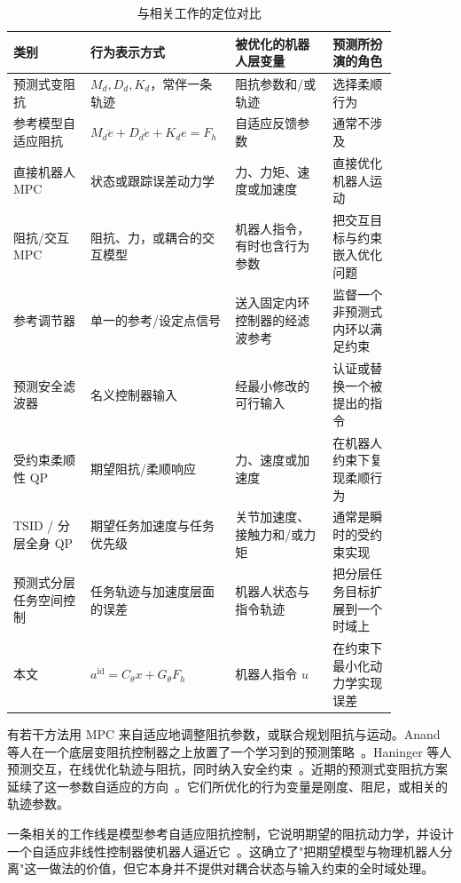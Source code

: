 \documentclass[journal]{IEEEtran}
\begin{document}
\begin{table}[t]
\centering
\caption{与相关工作的定位对比}
\label{tab:related}
\small
\begin{tabular}{@{}>{\raggedright\arraybackslash}p{0.19\linewidth}
>{\raggedright\arraybackslash}p{0.27\linewidth}
>{\raggedright\arraybackslash}p{0.24\linewidth}
>{\raggedright\arraybackslash}p{0.16\linewidth}@{}}
\toprule
类别 & 行为表示方式 & 被优化的机器人层变量 & 预测所扮演的角色 \\
\midrule
预测式变阻抗 & $M_d,D_d,K_d$，常伴一条轨迹 & 阻抗参数和/或轨迹 & 选择柔顺行为 \\
参考模型自适应阻抗 & $M_d\ddot e+D_d\dot e+K_de=F_h$ & 自适应反馈参数 & 通常不涉及 \\
直接机器人 MPC & 状态或跟踪误差动力学 & 力、力矩、速度或加速度 & 直接优化机器人运动 \\
阻抗/交互 MPC & 阻抗、力，或耦合的交互模型 & 机器人指令，有时也含行为参数 & 把交互目标与约束嵌入优化问题 \\
参考调节器 & 单一的参考/设定点信号 & 送入固定内环控制器的经滤波参考 & 监督一个非预测式内环以满足约束 \\
预测安全滤波器 & 名义控制器输入 & 经最小修改的可行输入 & 认证或替换一个被提出的指令 \\
受约束柔顺性 QP & 期望阻抗/柔顺响应 & 力、速度或加速度 & 在机器人约束下复现柔顺行为 \\
TSID / 分层全身 QP & 期望任务加速度与任务优先级 & 关节加速度、接触力和/或力矩 & 通常是瞬时的受约束实现 \\
预测式分层任务空间控制 & 任务轨迹与加速度层面的误差 & 机器人状态与指令轨迹 & 把分层任务目标扩展到一个时域上 \\
本文 & $a^{\mathrm{id}}=C_\theta x+G_\theta F_h$ & 机器人指令 $u$ & 在约束下最小化动力学实现误差 \\
\bottomrule
\end{tabular}
\end{table}

有若干方法用 MPC 来自适应地调整阻抗参数，或联合规划阻抗与运动。Anand 等人在一个底层变阻抗控制器之上放置了一个学习到的预测策略~\cite{ref1}。Haninger 等人预测交互，在线优化轨迹与阻抗，同时纳入安全约束~\cite{ref2}。近期的预测式变阻抗方案延续了这一参数自适应的方向~\cite{ref3}。它们所优化的行为变量是刚度、阻尼，或相关的轨迹参数。

一条相关的工作线是模型参考自适应阻抗控制，它说明期望的阻抗动力学，并设计一个自适应非线性控制器使机器人逼近它~\cite{ref4}。这确立了"把期望模型与物理机器人分离"这一做法的价值，但它本身并不提供对耦合状态与输入约束的全时域处理。
\end{document}
